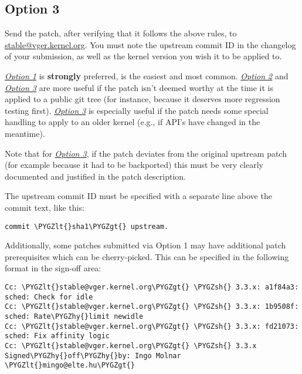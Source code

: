 \documentclass[a4paper,8pt,english]{sphinxmanual}
\def\PYGZlt{\char`\<}
\def\PYGZgt{\char`\>}
\def\PYGZsh{\char`\#}
\def\PYGZhy{\char`\-}
\begin{document}
\subsection{Option 3}
\label{process/stable-kernel-rules:id3}\label{process/stable-kernel-rules:option-3}
Send the patch, after verifying that it follows the above rules, to
\href{mailto:stable@vger.kernel.org}{stable@vger.kernel.org}.  You must note the upstream commit ID in the
changelog of your submission, as well as the kernel version you wish
it to be applied to.

{\hyperref[process/stable\string-kernel\string-rules:option\string-1]{\emph{Option 1}}} is \textbf{strongly} preferred, is the easiest and most common.
{\hyperref[process/stable\string-kernel\string-rules:option\string-2]{\emph{Option 2}}} and {\hyperref[process/stable\string-kernel\string-rules:option\string-3]{\emph{Option 3}}} are more useful if the patch isn't deemed
worthy at the time it is applied to a public git tree (for instance, because
it deserves more regression testing first).  {\hyperref[process/stable\string-kernel\string-rules:option\string-3]{\emph{Option 3}}} is especially
useful if the patch needs some special handling to apply to an older kernel
(e.g., if API's have changed in the meantime).

Note that for {\hyperref[process/stable\string-kernel\string-rules:option\string-3]{\emph{Option 3}}}, if the patch deviates from the original
upstream patch (for example because it had to be backported) this must be very
clearly documented and justified in the patch description.

The upstream commit ID must be specified with a separate line above the commit
text, like this:

\begin{Verbatim}[commandchars=\\\{\}]
commit \PYGZlt{}sha1\PYGZgt{} upstream.
\end{Verbatim}

Additionally, some patches submitted via Option 1 may have additional patch
prerequisites which can be cherry-picked. This can be specified in the following
format in the sign-off area:

\begin{Verbatim}[commandchars=\\\{\}]
Cc: \PYGZlt{}stable@vger.kernel.org\PYGZgt{} \PYGZsh{} 3.3.x: a1f84a3: sched: Check for idle
Cc: \PYGZlt{}stable@vger.kernel.org\PYGZgt{} \PYGZsh{} 3.3.x: 1b9508f: sched: Rate\PYGZhy{}limit newidle
Cc: \PYGZlt{}stable@vger.kernel.org\PYGZgt{} \PYGZsh{} 3.3.x: fd21073: sched: Fix affinity logic
Cc: \PYGZlt{}stable@vger.kernel.org\PYGZgt{} \PYGZsh{} 3.3.x
Signed\PYGZhy{}off\PYGZhy{}by: Ingo Molnar \PYGZlt{}mingo@elte.hu\PYGZgt{}
\end{Verbatim}
\end{document}

